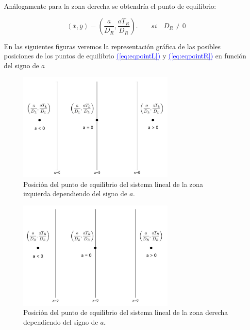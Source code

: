 \documentclass[12pt,a4paper]{report} %
\newcommand{\eref}[1]{\hyperref[#1]{\textcolor{blue}{(\ref*{#1})}}}
\begin{document}
		\vspace{0.5cm}\noindent Análogamente para la zona derecha se obtendría el punto de equilibrio:
		
		\begin{equation}
			\label{eq:eqpointR}
			\left( \overline{x},\overline{y} \right)=\left( \frac{a}{D_R},\frac{aT_R}{D_R} \right). \qquad si \quad D_R\neq0
		\end{equation}\smallskip
		
		\newpage
		
		En las siguientes figuras veremos la representación gráfica de las posibles posiciones de los puntos de equilibrio \eref{eq:eqpointL} y \eref{eq:eqpointR} en función del signo de $a$
		
		\begin{figure}[h]
			\centering
			\includegraphics[width=0.7\textwidth,center]{punto.jpg}
			\caption{Posición del punto de equilibrio del sistema lineal de la zona izquierda dependiendo del signo de $a$.}
			\label{fig:punto}
		\end{figure}\smallskip
		

		\begin{figure}[h]
			\includegraphics[width=0.7\textwidth,center]{puntoR.jpg}
			\caption{Posición del punto de equilibrio del sistema lineal de la zona derecha dependiendo del signo de $a$.}
			\label{fig:puntoR}
		\end{figure}
\end{document}

